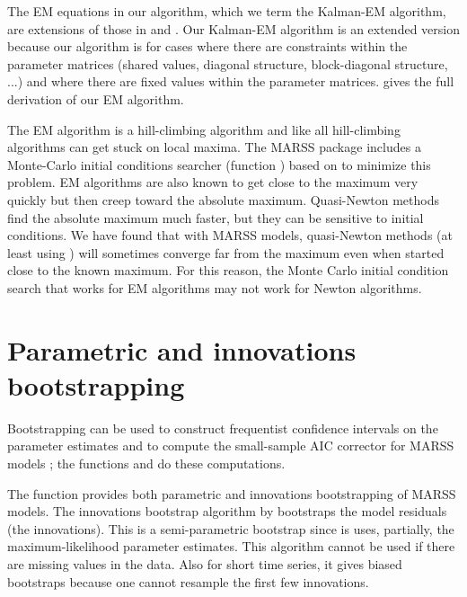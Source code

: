 The EM equations in our algorithm, which we term the Kalman-EM algorithm, are extensions of those in \citet{ShumwayStoffer1982} and \citet{GhahramaniHinton1996}.  Our Kalman-EM algorithm is an extended version because our algorithm is for cases where there are constraints within the parameter matrices (shared values, diagonal structure, block-diagonal structure, ...) and where there are fixed values within the parameter matrices.  \citet{Holmes2010} gives the full derivation of our EM algorithm.  

The EM algorithm is a hill-climbing algorithm and like all hill-climbing algorithms can get stuck on local maxima.  The MARSS package includes a Monte-Carlo initial conditions searcher (function \verb@MARSSmcinit@{}) based on \citet{Biernackietal2003} to minimize this problem.  EM algorithms are also known to get close to the maximum very quickly but then creep toward the absolute maximum.  Quasi-Newton methods find the absolute maximum much faster, but they can be  sensitive to initial conditions.  We have found that with MARSS models, quasi-Newton methods (at least using \verb@optim@{}) will sometimes converge far from the maximum even when started close to the known maximum. For this reason, the Monte Carlo initial condition search that works for EM algorithms may not work for Newton algorithms.

\section{Parametric and innovations bootstrapping}
Bootstrapping can be used to construct frequentist confidence intervals on the parameter estimates \citep{StofferWall1991} and to compute the small-sample AIC corrector for MARSS models \citep{CavanaughShumway1997}; the functions \verb@MARSSparamCIs@{} and \verb@MARSSaic@{} do these computations. 

The \verb@MARSSboot@{} function provides both parametric and innovations bootstrapping of MARSS models.  
The innovations bootstrap algorithm by \citet{StofferWall1991}  bootstraps the model residuals (the innovations).  This is a semi-parametric bootstrap since is uses, partially, the maximum-likelihood parameter estimates.  This algorithm cannot be used if there are missing values in the data.  Also for short time series, it gives biased bootstraps because one cannot resample the first few innovations.  

